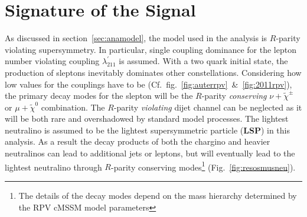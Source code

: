 \chapter{Signature of the Signal}
\label{cha:sig}

As discussed in section~\ref{sec:anamodel}, the model used in the analysis is $R$-parity violating supersymmetry. In particular, single coupling dominance for the lepton number violating coupling $\lambda^\prime_{211}$ is assumed. With a two quark initial state, the production of sleptons inevitably dominates other constellations. Considering how low values for the couplings have to be (Cf.~fig.~\ref{fig:auterrpv}~\&~\ref{fig:2011rpv}), the primary decay modes for the slepton will be the $R$-parity \textit{conserving} $\nu + \tilde{\chi}^\pm$ or $\mu + \tilde{\chi}^0$ combination. The $R$-parity \textit{violating} dijet channel can be neglected as it will be both rare and overshadowed by standard model processes. The lightest neutralino is assumed to be the lightest supersymmetric particle (\textbf{LSP}) in this analysis. As a result the decay products of both the chargino and heavier neutralinos can lead to additional jets or leptons, but will eventually lead to the lightest neutralino through $R$-parity conserving modes\footnote{The details of the decay modes depend on the mass hierarchy determined by the RPV cMSSM model parameters} (Fig.~\ref{fig:resosmusneu}). 


